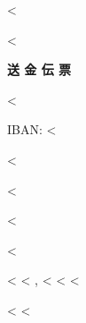 <%


\begin{CJK}{UTF8}{arialuni}


\vspace*{-3.3cm}
<%
\vspace*{1.5cm}

\centerline{\textbf{送 金 伝 票}}

\hfill <%

IBAN: <%

<%

\vspace{0.3cm}

<%

<%

<%

<%
<%
\hspace{-1mm}, <%
<%
<%

<%
\vfill
<%
\end{CJK}



